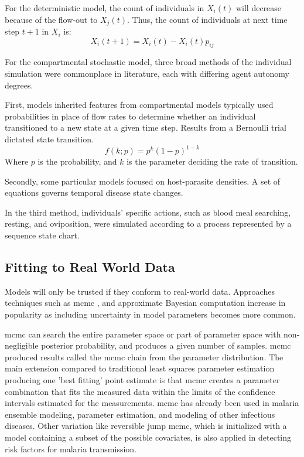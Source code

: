 \documentclass[a4paper, 12pt, twoside]{article}
\begin{document}
For the deterministic model, the count of individuals in $X_i(t)$ will decrease because of the flow-out to $X_j(t)$.
Thus, the count of individuals at next time step $t+1$ in $X_i$ is:
\begin{equation}
	X_i(t+1) = X_i(t) - X_i(t)p_{ij}
\end{equation}

For the compartmental stochastic model, three broad methods of the individual simulation were commonplace in literature, each with differing agent autonomy degrees.

First, models inherited features from compartmental models typically used probabilities in place of flow rates to determine whether an individual transitioned to a new state at a given time step.
Results from a Bernoulli trial dictated state transition.
\begin{equation}
	f(k;p) = p^k ( 1 - p )^{1 - k}
\end{equation}
Where $p$ is the probability, and  $k$ is the parameter deciding the rate of transition.

Secondly, some particular models focused on host-parasite densities.
A set of equations governs temporal disease state changes.

In the third method, individuals' specific actions, such as blood meal searching, resting, and oviposition, were simulated according to a process represented by a sequence state chart.

\subsection{Fitting to Real World Data}
Models will only be trusted if they conform to real-world data.
Approaches techniques such as \gls{mcmc} \cite{Hastings1970}, and approximate Bayesian computation increase in popularity as including uncertainty in model parameters becomes more common.

\gls{mcmc} can search the entire parameter space or part of parameter space with non-negligible posterior probability, and produces a given number of samples.
\gls{mcmc} produced results called the \gls{mcmc} chain from the parameter distribution.
The main extension compared to traditional least squares parameter estimation producing one ’best fitting’ point estimate is that \gls{mcmc} creates a parameter combination that fits the measured data within the limits of the confidence intervals estimated for the measurements.
\gls{mcmc} has already been used in malaria ensemble modeling\cite{Cameron2015,Penny2015,Penny2015a}, parameter estimation, and modeling of other infectious diseases.
Other variation like reversible jump \gls{mcmc}, which is initialized with a model containing a subset of the possible covariates, is also applied in detecting risk factors for malaria transmission\cite{Millar2018a}.
\end{document}
